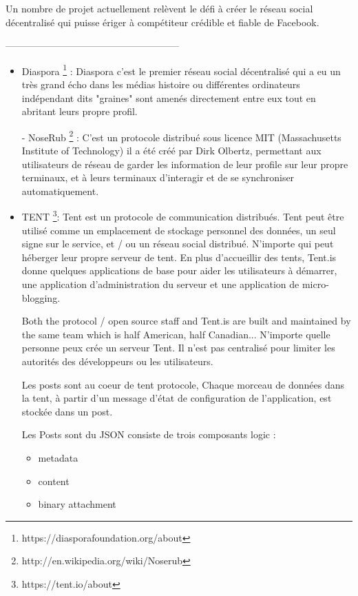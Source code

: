 Un nombre de projet actuellement relèvent le défi à créer le réseau social décentralisé qui puisse ériger à compétiteur crédible et fiable de Facebook.
  \begin{center}
------------------------------------------------------
\end{center}
\begin{itemize}
  \item Diaspora \footnote{https://diasporafoundation.org/about} : \newline
Diaspora c'est le premier réseau social décentralisé qui a eu un très grand écho dans les médias histoire ou différentes ordinateurs indépendant dits "graines" sont amenés directement entre eux tout en abritant leurs propre profil.

- NoseRub \footnote{http://en.wikipedia.org/wiki/Noserub} : C'est un protocole distribué sous licence MIT (Massachusetts Institute of Technology) 
il a été créé par Dirk Olbertz, permettant aux utilisateurs de réseau de garder les information de leur profile sur leur propre terminaux, et à leurs terminaux d'interagir et de se synchroniser automatiquement.
  \item TENT \footnote{https://tent.io/about}: \newline
Tent est un protocole de communication distribués. Tent peut être utilisé comme un emplacement de stockage personnel des données, un seul signe sur le service, et / ou un réseau social distribué. N'importe qui peut héberger leur propre serveur de tent. En plus d'accueillir des tents, Tent.is donne quelques applications de base pour aider les utilisateurs à démarrer, une application d'administration du serveur et une application de micro-blogging.

Both the protocol / open source staff and Tent.is are built and maintained by the same team which is half American, half Canadian...
N'importe quelle personne peux crée un serveur Tent. Il n'est pas centralisé pour limiter les autorités des développeurs ou les utilisateurs.

Les posts sont au coeur de tent protocole, Chaque morceau de données dans la tent, à partir d'un message d'état de configuration de l'application, est stockée dans un post.

Les Posts sont du JSON consiste de trois composants logic :
\begin{itemize}
  \item metadata 
 \item content 
 \item binary attachment
\end{itemize}


\end{itemize}
